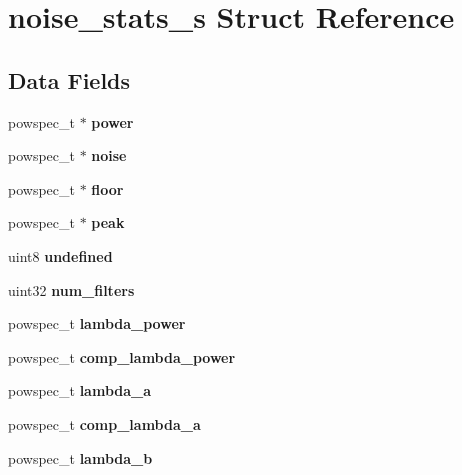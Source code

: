 \section{noise\-\_\-stats\-\_\-s Struct Reference}
\label{structnoise__stats__s}
\subsection*{Data Fields}
\begin{DoxyCompactItemize}
\item 
powspec\-\_\-t $\ast$ {\bfseries power}\label{structnoise__stats__s_a3352c66489d54b578e5f43cc646951dc}

\item 
powspec\-\_\-t $\ast$ {\bfseries noise}\label{structnoise__stats__s_ab21b71b8202302859b120b08b42bb4bb}

\item 
powspec\-\_\-t $\ast$ {\bfseries floor}\label{structnoise__stats__s_aea4aaa0528b85a2989743afee3f21964}

\item 
powspec\-\_\-t $\ast$ {\bfseries peak}\label{structnoise__stats__s_a36e6b3a83014d30755b763fa8575a35d}

\item 
uint8 {\bfseries undefined}\label{structnoise__stats__s_a84138e0f5dd6bc3c8049cce8ea815678}

\item 
uint32 {\bfseries num\-\_\-filters}\label{structnoise__stats__s_ad5b17abb96cc825153b41f1506018c3c}

\item 
powspec\-\_\-t {\bfseries lambda\-\_\-power}\label{structnoise__stats__s_aae414a12fd0b4b8be3a61468fe15f3de}

\item 
powspec\-\_\-t {\bfseries comp\-\_\-lambda\-\_\-power}\label{structnoise__stats__s_a7d2228c947b372142346861adbf16acb}

\item 
powspec\-\_\-t {\bfseries lambda\-\_\-a}\label{structnoise__stats__s_a804b3c775a7d80c95a2a53e9eb0d6b3a}

\item 
powspec\-\_\-t {\bfseries comp\-\_\-lambda\-\_\-a}\label{structnoise__stats__s_a047be8fb044da7e3a3f45b78e9d5de23}

\item 
powspec\-\_\-t {\bfseries lambda\-\_\-b}\label{structnoise__stats__s_a56527a4cfd15aac96133ed20989c89c7}


\end{DoxyCompactItemize}

